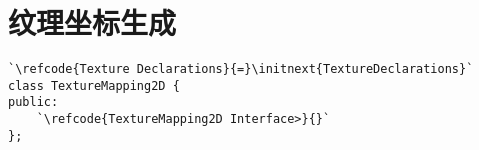 \section{纹理坐标生成}\label{sec:纹理坐标生成}

\begin{lstlisting}
`\refcode{Texture Declarations}{=}\initnext{TextureDeclarations}`
class TextureMapping2D {
public:
    `\refcode{TextureMapping2D Interface>}{}`
};
\end{lstlisting}